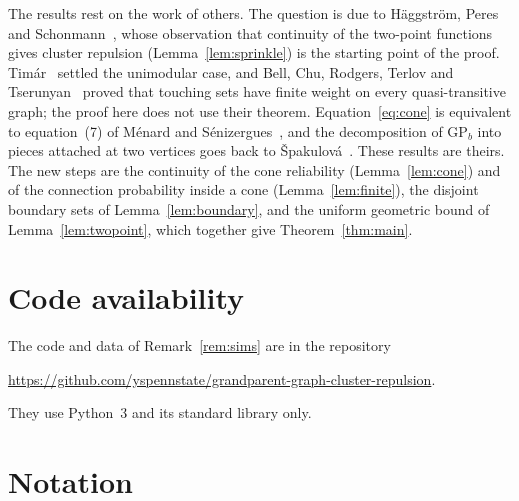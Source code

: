 \documentclass[11pt]{amsart}
\theoremstyle{remark}
\newcommand{\GP}{\mathrm{GP}_b}
\begin{document}
The results rest on the work of others. The question is due to Häggström, Peres and Schonmann~\cite{HPS99}, whose
observation that continuity of the two-point functions gives cluster repulsion (Lemma~\ref{lem:sprinkle}) is the
starting point of the proof. Timár~\cite{Tim06a} settled the unimodular case, and Bell, Chu, Rodgers, Terlov and
Tserunyan~\cite{BCRTT} proved that touching sets have finite weight on every quasi-transitive graph; the proof here does
not use their theorem. Equation~\eqref{eq:cone} is equivalent to equation~(7) of Ménard and Sénizergues~\cite{MS26}, and
the decomposition of $\GP$ into pieces attached at two vertices goes back to Špakulová~\cite{Spa09}. These results are
theirs. The new steps are the continuity of the cone reliability (Lemma~\ref{lem:cone}) and of the connection
probability inside a cone (Lemma~\ref{lem:finite}), the disjoint boundary sets of Lemma~\ref{lem:boundary}, and the
uniform geometric bound of Lemma~\ref{lem:twopoint}, which together give Theorem~\ref{thm:main}.

\section*{Code availability}
The code and data of Remark~\ref{rem:sims} are in the repository
\begin{center}\url{https://github.com/yspennstate/grandparent-graph-cluster-repulsion}.\end{center}
They use Python~3 and its standard library only.

\appendix
\section{Notation}\label{app:notation}
\end{document}

